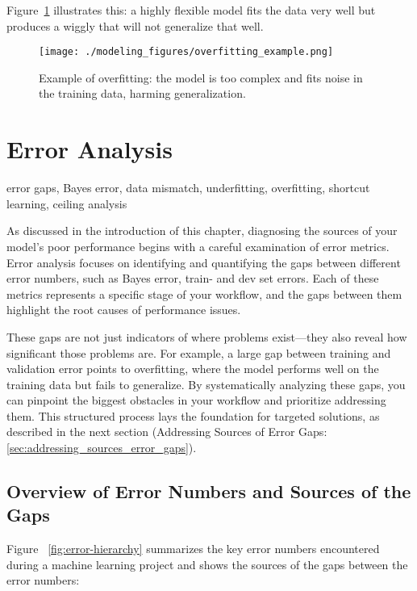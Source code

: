 \documentclass[12pt,openany]{book}
\begin{document}
Figure~\ref{fig:overfitting-example} illustrates this: a highly flexible model fits the data very well but produces a wiggly that will not generalize that well.

\begin{figure}[H]
    \centering
    \texttt{[image: ./modeling\_figures/overfitting\_example.png]}
    \caption{Example of overfitting: the model is too complex and fits noise in the training data, harming generalization.}
    \label{fig:overfitting-example}
\end{figure}



\section{Error Analysis} \label{sec:error_analysis}

\begin{keywordsbox}
error gaps, Bayes error, data mismatch, underfitting, overfitting, shortcut learning, ceiling analysis
\end{keywordsbox}

As discussed in the introduction of this chapter, diagnosing the sources of your model’s poor performance begins with a careful examination of error metrics. Error analysis focuses on identifying and quantifying the gaps between different error numbers, such as Bayes error, train- and dev set errors. Each of these metrics represents a specific stage of your workflow, and the gaps between them highlight the root causes of performance issues. \newline

These gaps are not just indicators of where problems exist—they also reveal how significant those problems are. For example, a large gap between training and validation error points to overfitting, where the model performs well on the training data but fails to generalize. By systematically analyzing these gaps, you can pinpoint the biggest obstacles in your workflow and prioritize addressing them. This structured process lays the foundation for targeted solutions, as described in the next section (Addressing Sources of Error Gaps: \ref{sec:addressing_sources_error_gaps}).

\subsection{Overview of Error Numbers and Sources of the Gaps}

Figure ~\ref{fig:error-hierarchy} summarizes the key error numbers encountered during a machine learning project and shows the sources of the gaps between the error numbers:
\end{document}
